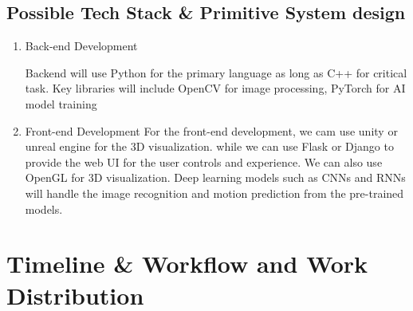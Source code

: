 \documentclass[a4paper,12pt]{article}
\begin{document}
\subsection{Possible Tech Stack \& Primitive System design}
\begin{enumerate}
    \item Back-end Development

 Backend will use Python for the primary language as long as C++ for critical task. Key libraries will include OpenCV for image processing, PyTorch for AI model training
    \item Front-end Development
For the front-end development, we cam use unity or unreal engine for the 3D visualization. while we can use Flask or Django to provide the web UI for the user controls and experience. We can also use OpenGL for 3D visualization. Deep learning models such as CNNs and RNNs will handle the image recognition and motion prediction from the pre-trained models.
\end{enumerate}

\newpage

\section{Timeline \& Workflow and Work Distribution}
\end{document}
